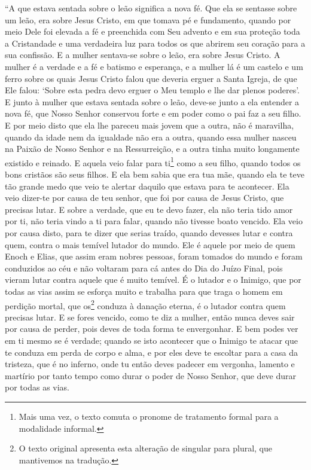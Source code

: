 “A que estava sentada sobre o leão significa a nova fé. Que ela se sentasse
sobre um leão, era sobre Jesus Cristo, em que tomava pé e fundamento, quando
por meio Dele foi elevada a fé e preenchida com Seu advento e em sua proteção
toda a Cristandade e uma verdadeira luz para todos os que abrirem seu coração
para a sua confissão. E a mulher sentava-se sobre o leão,  era sobre Jesus
Cristo. A mulher é a verdade e a fé e batismo e esperança, e a mulher lá é um
castelo e um ferro sobre os quais Jesus Cristo falou que deveria erguer a Santa
Igreja, de que Ele falou: ‘Sobre esta pedra devo erguer o Meu templo e lhe dar
plenos poderes’. E junto à mulher que estava sentada sobre o leão, deve-se
junto a ela entender a nova fé, que Nosso Senhor conservou forte e em poder
como o pai faz a seu filho. E por meio disto que ela lhe pareceu mais jovem que
a outra, não é maravilha, quando da idade nem da igualdade não era a outra,
quando essa mulher nasceu na Paixão de Nosso Senhor e na Ressurreição, e a
outra tinha muito longamente existido e reinado. E aquela veio falar para
ti\footnote{ Mais uma vez, o texto comuta o pronome de tratamento formal para a
modalidade informal.}  como a seu filho, quando todos os bons
cristãos são seus filhos. E ela bem sabia que era tua mãe, quando ela te teve
tão grande medo que veio te alertar daquilo que estava para te acontecer. Ela
veio dizer-te por causa de teu senhor, que foi por causa de Jesus Cristo, que
precisas lutar. E sobre a verdade, que eu te devo fazer, ela não teria tido
amor por ti, não teria vindo a ti para falar, quando não tivesse boato vencido.
Ela veio por causa disto, para te dizer que serias traído, quando devesses
lutar e contra quem, contra o mais temível lutador do mundo. Ele é aquele por
meio de quem Enoch e Elias, que assim eram nobres pessoas, foram tomados do
mundo e foram conduzidos ao céu e não voltaram para cá antes do Dia do Juízo
Final, pois vieram lutar contra aquele que é muito temível. É o lutador e o
Inimigo, que por todas as vias assim se esforça muito e trabalha para que traga
o homem em perdição mortal, que os\footnote{ O texto original apresenta esta
alteração de singular para plural, que mantivemos na tradução.} 
conduza à danação eterna, é o lutador contra quem precisas lutar. E se fores
vencido, como te diz a mulher, então nunca deves sair por causa de perder, pois
deves de toda forma te envergonhar. E bem podes ver em ti mesmo se é verdade;
quando se isto acontecer que o Inimigo te atacar que te conduza em perda de
corpo e alma, e por eles deve te escoltar para a casa da tristeza, que é no
inferno, onde tu então deves padecer em vergonha, lamento e martírio por tanto
tempo como durar o poder de Nosso Senhor, que deve durar por todas as vias.

